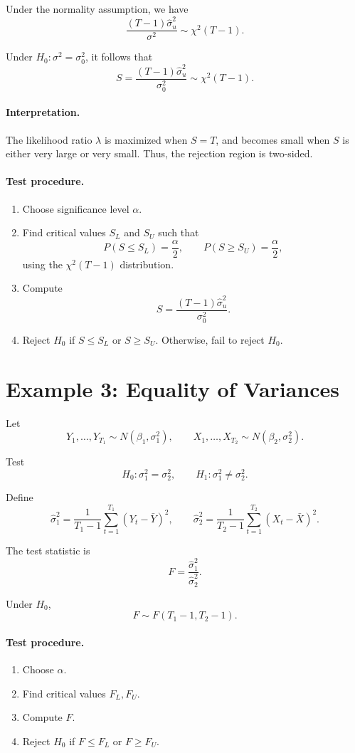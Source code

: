 Under the normality assumption, we have
\[
\frac{(T-1)\hat{\sigma}_u^2}{\sigma^2}
\sim \chi^2(T-1).
\]

Under $H_0:\sigma^2=\sigma_0^2$, it follows that
\[
S
=
\frac{(T-1)\hat{\sigma}_u^2}{\sigma_0^2}
\sim \chi^2(T-1).
\]

\paragraph{Interpretation.}

The likelihood ratio $\lambda$ is maximized when $S=T$, and becomes small when $S$ is either very large or very small.
Thus, the rejection region is two-sided.

\paragraph{Test procedure.}

\begin{enumerate}
\item Choose significance level $\alpha$.
\item Find critical values $S_L$ and $S_U$ such that
\[
P(S \le S_L)=\frac{\alpha}{2},
\qquad
P(S \ge S_U)=\frac{\alpha}{2},
\]
using the $\chi^2(T-1)$ distribution.
\item Compute
\[
S = \frac{(T-1)\hat{\sigma}_u^2}{\sigma_0^2}.
\]
\item Reject $H_0$ if $S \le S_L$ or $S \ge S_U$.
Otherwise, fail to reject $H_0$.
\end{enumerate}



\section{Example 3: Equality of Variances}

Let
\[
Y_1,\dots,Y_{T_1} \sim N(\beta_1,\sigma_1^2),
\qquad
X_1,\dots,X_{T_2} \sim N(\beta_2,\sigma_2^2).
\]

Test
\[
H_0:\sigma_1^2=\sigma_2^2,
\qquad
H_1:\sigma_1^2\neq\sigma_2^2.
\]

Define
\[
\hat{\sigma}_1^2
=
\frac{1}{T_1-1}\sum_{t=1}^{T_1}(Y_t-\bar{Y})^2,
\qquad
\hat{\sigma}_2^2
=
\frac{1}{T_2-1}\sum_{t=1}^{T_2}(X_t-\bar{X})^2.
\]

The test statistic is
\[
F
=
\frac{\hat{\sigma}_1^2}{\hat{\sigma}_2^2}.
\]

Under $H_0$,
\[
F \sim F(T_1-1,T_2-1).
\]

\paragraph{Test procedure.}
\begin{enumerate}
\item Choose $\alpha$.
\item Find critical values $F_L, F_U$.
\item Compute $F$.
\item Reject $H_0$ if $F \le F_L$ or $F \ge F_U$.
\end{enumerate}

